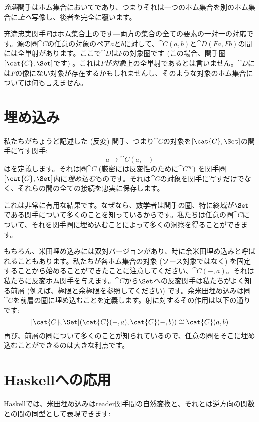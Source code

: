 \emph{充満}関手はホム集合においてであり、つまりそれは一つのホム集合を別のホム集合に\emph{上へ}写像し、後者を完全に覆います。

充満忠実関手$F$はホム集合上のです---両方の集合の全ての要素の一対一の対応です。源の圏$\cat{C}$の任意の対象のペア$a$と$b$に対して、$\cat{C}(a, b)$と$\cat{D}(F a, F b)$の間には全単射があります。ここで$\cat{D}$は$F$の対象圏です (この場合、関手圏$[\cat{C}, \Set]$です) 。これは$F$が\emph{対象}上の全単射であるとは言いません。$\cat{D}$には$F$の像にない対象が存在するかもしれませんし、そのような対象のホム集合については何も言えません。

\section{埋め込み}

私たちがちょうど記述した (反変) 関手、つまり$\cat{C}$の対象を$[\cat{C}, \Set]$の関手に写す関手: 
\[a \to \cat{C}(a, -)\]
はを定義します。それは圏$\cat{C}$ (厳密には反変性のために$\cat{C}^\mathit{op}$) を関手圏$[\cat{C}, \Set]$内に\emph{埋め込む}ものです。それは$\cat{C}$の対象を関手に写すだけでなく、それらの間の全ての接続を忠実に保存します。

これは非常に有用な結果です。なぜなら、数学者は関手の圏、特に終域が$\Set$である関手について多くのことを知っているからです。私たちは任意の圏$\cat{C}$について、それを関手圏に埋め込むことによって多くの洞察を得ることができます。

もちろん、米田埋め込みには双対バージョンがあり、時に余米田埋め込みと呼ばれることもあります。私たちが各ホム集合の対象 (ソース対象ではなく) を固定することから始めることができたことに注意してください、$\cat{C}(-, a)$。それは私たちに反変ホム関手を与えます。$\cat{C}$から$\Set$への反変関手は私たちがよく知る前層 (例えば、\hyperref[limits-and-colimits]{極限と余極限}を参照してください) です。余米田埋め込みは圏$\cat{C}$を前層の圏に埋め込むことを定義します。射に対するその作用は以下の通りです: 
\[[\cat{C}, \Set](\cat{C}(-, a), \cat{C}(-, b)) \cong \cat{C}(a, b)\]
再び、前層の圏について多くのことが知られているので、任意の圏をそこに埋め込むことができるのは大きな利点です。

\section{Haskellへの応用}

Haskellでは、米田埋め込みはreader関手間の自然変換と、それとは逆方向の関数との間の同型として表現できます: 

